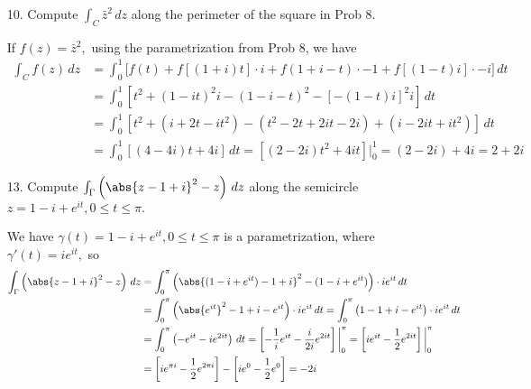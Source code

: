 \documentclass{article}
\begin{document}
\begin{itemize}
	\item[10.] Compute $\int_C \bar z^2\, dz$ along the perimeter of the square in Prob 8.
		\begin{soln}
			If $f(z)=\bar z^2,$ using the parametrization from Prob 8, we have
			\begin{align*}
				\int_C f(z)\, dz &= \int_0^1 \bigg[ f(t) + f\left[ (1+i)t \right]\cdot i + f(1+i-t)\cdot -1 + f\left[ (1-t)i \right]\cdot -i \bigg]\, dt \\
				&= \int_0^1 \left[ t^2 + (1-it)^2i - (1-i-t)^2 - \left[ -(1-t)i \right]^2i\right]\, dt \\
				&= \int_0^1 \left[ t^2 + \left( i+2t-it^2 \right) - (t^2-2t+2it-2i) + (i-2it+it^2) \right]\, dt \\
				&= \int_0^1\left[ (4-4i)t + 4i \right]\, dt = \left[ (2-2i)t^2 + 4it \right]\bigg|_0^1 = (2-2i)+4i = 2+2i
			\end{align*}
		\end{soln}

	\item[13.] Compute $\int_\Gamma\left( \abs{z-1+i}^2-z \right)\, dz$ along the semicircle $z=1-i+e^{it}, 0\le t\le \pi.$
		\begin{soln}
			We have $\gamma(t)=1-i+e^{it}, 0\le t\le \pi$ is a parametrization, where $\gamma'(t)=ie^{it},$ so
			\begin{align*}
				\int_\Gamma\left( \abs{z-1+i}^2-z \right)\, dz &= \int_0^\pi \left( \abs{(1-i+e^{it}) - 1 + i}^2 - (1-i+e^{it}) \right)\cdot ie^{it}\, dt \\
				&= \int_0^\pi \left( \abs{e^{it}}^2 - 1 + i -e^{it} \right)\cdot ie^{it}\, dt = \int_0^\pi \left( 1-1+i-e^{it} \right)\cdot ie^{it}\, dt \\
				&= \int_0^\pi \left( -e^{it} - ie^{2it} \right)\, dt = \left[ -\frac{1}{i} e^{it} - \frac{i}{2i}e^{2it} \right]\bigg|_0^\pi = \left[ ie^{it} - \frac{1}{2}e^{2it} \right]\bigg|_0^\pi \\
				&= \left[ ie^{\pi i} - \frac{1}{2} e^{2\pi i} \right] - \left[ ie^{0} - \frac{1}{2}e^0 \right] = -2i
			\end{align*}
		\end{soln}

\end{itemize}
\end{document}
